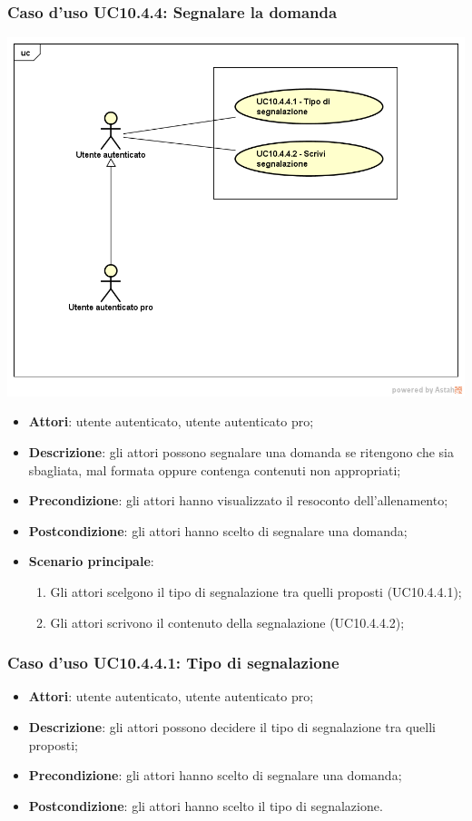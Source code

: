 \subsubsection{Caso d'uso UC10.4.4: Segnalare la domanda}
\label{UC10.4.4}
\begin{center}
	\centering
	\includegraphics[scale=0.5]{UML/UC10_4_4.png}
\end{center}
\FloatBarrier
	\begin{itemize}
		\item \textbf{Attori}: utente autenticato, utente autenticato pro;
		\item \textbf{Descrizione}: gli attori possono segnalare una domanda se ritengono che sia sbagliata, mal formata oppure contenga contenuti non appropriati;
		\item \textbf{Precondizione}: gli attori hanno visualizzato il resoconto dell'allenamento;
		\item \textbf{Postcondizione}: gli attori hanno scelto di segnalare una domanda;
				\item \textbf{Scenario principale}:
				\begin{enumerate}
					\item Gli attori scelgono il tipo di segnalazione tra quelli proposti (UC10.4.4.1);
					\item Gli attori scrivono il contenuto della segnalazione (UC10.4.4.2);
				\end{enumerate}
	\end{itemize}
\subsubsection{Caso d'uso UC10.4.4.1: Tipo di segnalazione}
	\begin{itemize}
		\item \textbf{Attori}: utente autenticato, utente autenticato pro;
		\item \textbf{Descrizione}: gli attori possono decidere il tipo di segnalazione tra quelli proposti;
		\item \textbf{Precondizione}: gli attori hanno scelto di segnalare una domanda;
		\item \textbf{Postcondizione}: gli attori hanno scelto il tipo di segnalazione.
	\end{itemize}
